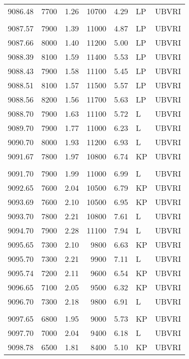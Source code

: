 \begin{center}
\begin{tabular} {l r c r c l l}
 9086.48  &  7700  &  1.26   &    10700  &  4.29 & LP  &  UBVRI \\
  \\
 9087.57  &  7900  &  1.39   &    11000  &  4.87 & LP  &  UBVRI \\
 9087.66  &  8000  &  1.40   &    11200  &  5.00 & LP  &  UBVRI \\
 9088.39  &  8100  &  1.59   &    11400  &  5.53 & LP  &  UBVRI \\
 9088.43  &  7900  &  1.58   &    11100  &  5.45 & LP  &  UBVRI \\
 9088.51  &  8100  &  1.57   &    11500  &  5.57 & LP  &  UBVRI \\
 9088.56  &  8200  &  1.56   &    11700  &  5.63 & LP  &  UBVRI \\
 9088.70  &  7900  &  1.63   &    11100  &  5.72 & L &  UBVRI \\
 9089.70  &  7900  &  1.77   &    11000  &  6.23 & L &  UBVRI \\
 9090.70  &  8000  &  1.93   &    11200  &  6.93 & L &  UBVRI \\
 9091.67  &  7800  &  1.97   &    10800  &  6.74 & KP &  UBVRI \\
  \\
 9091.70  &  7900  &  1.99   &    11000  &  6.99 & L &  UBVRI \\
 9092.65  &  7600  &  2.04   &    10500  &  6.79 & KP &  UBVRI \\
 9093.69  &  7600  &  2.10   &    10500  &  6.95 & KP &  UBVRI \\
 9093.70  &  7800  &  2.21   &    10800  &  7.61 & L &  UBVRI \\
 9094.70  &  7900  &  2.28   &    11100  &  7.94 & L &  UBVRI \\
 9095.65  &  7300  &  2.10   &     9800  &  6.63 & KP &  UBVRI \\
 9095.70  &  7300  &  2.21   &     9900  &  7.11 & L &  UBVRI \\
 9095.74  &  7200  &  2.11   &     9600  &  6.54 & KP &  UBVRI \\
 9096.65  &  7100  &  2.05   &     9500  &  6.32 & KP &  UBVRI \\
 9096.70  &  7300  &  2.18   &     9800  &  6.91 & L &  UBVRI \\
  \\
 9097.65  &  6800  &  1.95   &     9000  &  5.73 & KP &  UBVRI \\
 9097.70  &  7000  &  2.04   &     9400  &  6.18 & L &  UBVRI \\
 9098.78  &  6500  &  1.81   &     8400  &  5.10 & KP &  UBVRI \\

\end{tabular}
\end{center}
